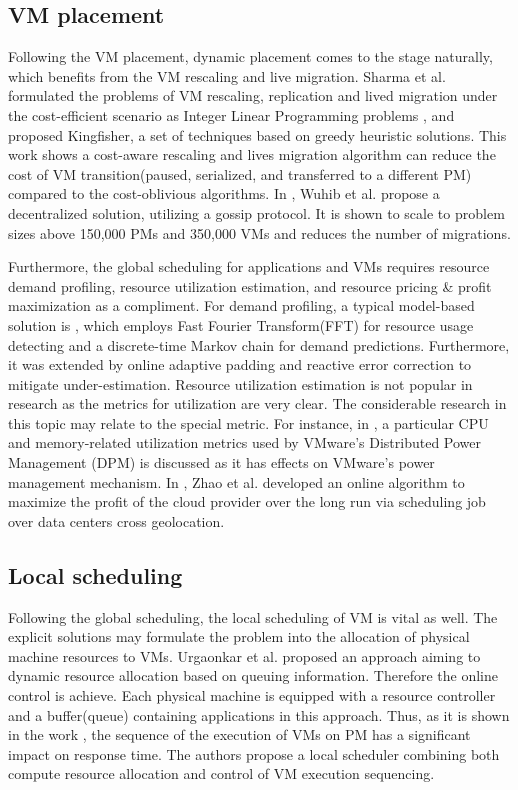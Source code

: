 \documentclass[sigchi]{acmart}
\begin{document}
\subsection{VM placement}
Following the VM placement, dynamic placement comes to the stage naturally, which benefits from the VM rescaling and live migration.
Sharma et al. \cite{5961733}\cite{5935016} formulated the problems of VM rescaling, replication and lived migration under the cost-efficient scenario as Integer Linear Programming problems
, and proposed Kingfisher, a set of techniques based on greedy heuristic solutions.
This work shows a cost-aware rescaling and lives migration algorithm can reduce the cost of VM transition(paused, serialized, and transferred to a different PM) compared to the cost-oblivious algorithms.
In \cite{6172596}, Wuhib et al. propose a decentralized solution, utilizing a gossip protocol. It is shown to scale to problem sizes above 150,000 PMs and 350,000 VMs and reduces the number of migrations.

Furthermore, the global scheduling for applications and VMs requires resource demand profiling, resource utilization estimation, and resource pricing \& profit maximization as a compliment.
For demand profiling, a typical model-based solution is \cite{gong2010press}, which employs Fast Fourier Transform(FFT) for resource usage detecting and a discrete-time Markov chain for demand predictions.
Furthermore, it was extended by online adaptive padding and reactive error correction to mitigate under-estimation\cite{shen2011cloudscale}.
Resource utilization estimation is not popular in research as the metrics for utilization are very clear.
The considerable research in this topic may relate to the special metric. 
For instance, in \cite{gmach2011chargeback}, a particular CPU and memory-related utilization metrics used by VMware’s Distributed Power Management (DPM) is discussed as it has effects on VMware’s power management mechanism.
In \cite{6847931}, Zhao et al. developed an online algorithm to maximize the profit of the cloud provider over the long run via scheduling job over data centers cross geolocation.

\subsection{Local scheduling}
Following the global scheduling, the local scheduling of VM is vital as well.
The explicit solutions may formulate the problem into the allocation of physical machine resources to VMs.
Urgaonkar et al. proposed an approach aiming to dynamic resource allocation based on queuing information. Therefore the online control is achieve\cite{5488484}.
Each physical machine is equipped with a resource controller and a buffer(queue) containing applications in this approach.
Thus, as it is shown in the work \cite{6195591}, the sequence of the execution of VMs on PM has a significant impact on response time.
The authors propose a local scheduler combining both compute resource allocation and control of VM execution sequencing.
\end{document}
